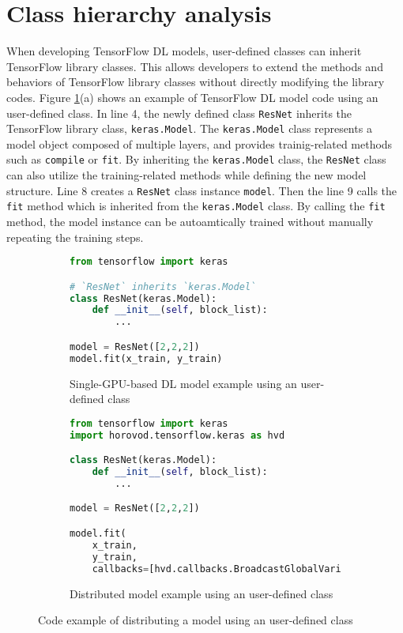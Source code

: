 \section{Class hierarchy analysis}\label{sec:cha}

When developing TensorFlow DL models, user-defined classes can
inherit TensorFlow library classes. 
This allows developers to extend the methods and behaviors of TensorFlow
library classes without directly modifying the library codes. 
Figure \ref{fig:cha:tfex}(a) shows an example of TensorFlow DL model
code using an user-defined class.
In line 4, the newly defined class {\tt ResNet} inherits the TensorFlow
library class, {\tt keras.Model}.
The {\tt keras.Model} class represents a model object composed of multiple
layers, and provides trainig-related methods such as {\tt compile} or {\tt fit}.
By inheriting the {\tt keras.Model} class, the {\tt ResNet} class
can also utilize the training-related methods while defining the new model
structure.
Line 8 creates a {\tt ResNet} class instance {\tt model}.
Then the line 9 calls the {\tt fit} method which is inherited from the
{\tt keras.Model} class.
By calling the {\tt fit} method, the model instance can be autoamtically
trained without manually repeating the training steps.

\begin{figure}[!ht]
  \centering
  \begin{subfigure}[t]{0.48\textwidth}
    \begin{lstlisting}[language=Python]
from tensorflow import keras

# `ResNet` inherits `keras.Model`
class ResNet(keras.Model): 
    def __init__(self, block_list):
        ...

model = ResNet([2,2,2])
model.fit(x_train, y_train)\end{lstlisting}
    \caption{Single-GPU-based DL model example using an user-defined class}
  \end{subfigure}
  \hspace{5mm}
  \begin{subfigure}[t]{0.48\textwidth}
    \begin{lstlisting}[language=Python]
from tensorflow import keras
import horovod.tensorflow.keras as hvd

class ResNet(keras.Model):
    def __init__(self, block_list):
        ...

model = ResNet([2,2,2])

model.fit(
    x_train, 
    y_train,
    callbacks=[hvd.callbacks.BroadcastGlobalVariablesCallback(0)])\end{lstlisting}
    \caption{Distributed model example using an user-defined class}
  \end{subfigure}

  \caption{Code example of distributing a model using an user-defined class}
  \label{fig:cha:tfex}
\end{figure}

